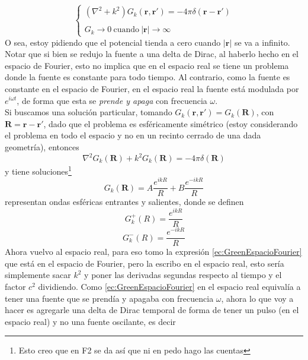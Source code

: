 \begin{equation}
    \left\{ 
        \begin{matrix}
            \left(
                \nabla^{2} + k^{2}
            \right)
            G_{k}(\textbf{r},\textbf{r}')
            = -4\pi\delta(\textbf{r}-\textbf{r}')\\
            \\
            G_{k}\to 0\ \mbox{cuando}\ |\textbf{r}|\to \infty
        \end{matrix}
    \right.
        \label{ec:GreenEspacioFourier}
\end{equation}
O sea, estoy pidiendo que el potencial tienda a cero cuando $|\textbf{r}|$ se va a infinito. Notar que si bien se redujo la fuente a una delta de Dirac, al haberlo hecho en el espacio de Fourier, esto no implica que en el espacio real se tiene un problema donde la fuente es constante para todo tiempo. Al contrario, como la fuente es constante en el espacio de Fourier, en el espacio real la fuente está modulada por $e^{i\omega t}$, de forma que esta se \textit{prende y apaga} con frecuencia $\omega$.\\
\indent Si buscamos una solución particular, tomando $G_{k}(\textbf{r},\textbf{r}') = G_{k}(\textbf{R})$, con $\textbf{R} = \textbf{r}-\textbf{r}'$, dado que el problema es esféricamente simétrico (estoy considerando el problema en todo el espacio y no en un recinto cerrado de una dada geometría), entonces
\begin{equation*}
    \nabla^{2}G_{k}(\textbf{R}) + k^{2}G_{k}(\textbf{R}) = 
    -4\pi\delta(\textbf{R})
\end{equation*}
y tiene soluciones\footnote{Esto creo que en F2 se da así que ni en pedo hago las cuentas}
\begin{equation*}
    G_{k}(\textbf{R}) = 
    A\frac{e^{ikR}}{R} + B\frac{e^{-ikR}}{R}
\end{equation*}
representan ondas esféricas entrantes y salientes, donde se definen
\begin{equation*}
    G_{k}^{+}(R) = \frac{e^{ikR}}{R}
\end{equation*}
\begin{equation*}
    G_{k}^{-}(R) = \frac{e^{-ikR}}{R}
\end{equation*}
Ahora vuelvo al espacio real, para eso tomo la expresión \eqref{ec:GreenEspacioFourier} que está en el espacio de Fourier, pero la escribo en el espacio real, esto sería simplemente sacar $k^{2}$ y poner las derivadas segundas respecto al tiempo y el factor $c^{2}$ dividiendo. Como \eqref{ec:GreenEspacioFourier} en el espacio real equivalía a tener una fuente que se prendía y apagaba con frecuencia $\omega$, ahora lo que voy a hacer es agregarle una delta de Dirac temporal de forma de tener un pulso (en el espacio real) y no una fuente oscilante, es decir
